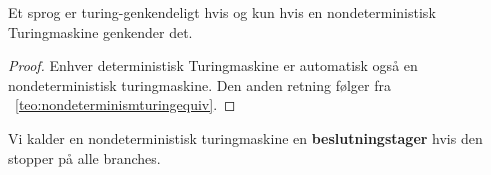 \begin{corollary}
Et sprog er turing-genkendeligt hvis og kun hvis en nondeterministisk Turingmaskine genkender det.
\end{corollary}

\begin{proof}
  Enhver deterministisk Turingmaskine er automatisk også en nondeterministisk turingmaskine. Den anden retning følger fra ~\ref{teo:nondeterminismturingequiv}.
\end{proof}

Vi kalder en nondeterministisk turingmaskine en \textbf{beslutningstager} hvis den stopper på alle branches.






